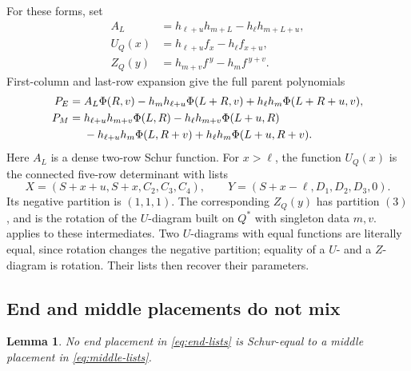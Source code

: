 \documentclass[11pt,a4paper]{amsart}
\numberwithin{equation}{section}
\theoremstyle{plain}
\newtheorem{lemma}[theorem]{Lemma}
\theoremstyle{definition}
\begin{document}
For these forms, set
\begin{equation}\label{eq:auxiliary-parent-functions}
 \begin{aligned}
 A_L&=h_{\ell+u}h_{m+L}-h_\ell h_{m+L+u},\\
 U_Q(x)&=h_{\ell+u}f_x-h_\ell f_{x+u},\\
 Z_Q(y)&=h_{m+v}f^{\,y}-h_m f^{\,y+v}.
 \end{aligned}
\end{equation}
First-column and last-row expansion give the full parent polynomials
\begin{align}
 P_E={}&A_L\Phi(R,v)-h_mh_{\ell+u}\Phi(L+R,v)
             +h_\ell h_m\Phi(L+R+u,v),\label{eq:end-polynomial}\\
 P_M={}&h_{\ell+u}h_{m+v}\Phi(L,R)-h_\ell h_{m+v}\Phi(L+u,R)
 \notag\\
 &-h_{\ell+u}h_m\Phi(L,R+v)+h_\ell h_m\Phi(L+u,R+v).
 \label{eq:middle-polynomial}
\end{align}
Here \(A_L\) is a dense two-row Schur function.  For \(x>\ell\), the function \(U_Q(x)\) is the connected five-row determinant with lists
\begin{equation}\label{eq:intermediate-U}
 X=(S+x+u,S+x,C_2,C_3,C_4),\qquad
 Y=(S+x-\ell,D_1,D_2,D_3,0).
\end{equation}
Its negative partition is \((1,1,1)\).  The corresponding \(Z_Q(y)\) has partition \((3)\), and is the rotation of the \(U\)-diagram built on \(Q^*\) with singleton data \(m,v\).   applies to these intermediates.  Two \(U\)-diagrams with equal functions are literally equal, since rotation changes the negative partition; equality of a \(U\)- and a \(Z\)-diagram is rotation.  Their lists then recover their parameters.

\subsection{End and middle placements do not mix}

\begin{lemma}\label{lem:end-middle-separation}
No end placement in \eqref{eq:end-lists} is Schur-equal to a middle placement in \eqref{eq:middle-lists}.
\end{lemma}
\end{document}
